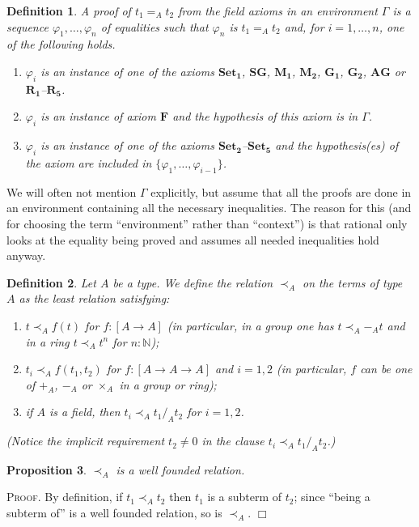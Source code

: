 \documentclass{article}
\newtheorem{definition}{Definition}[section]
\newtheorem{proposition}[definition]{Proposition}
\newenvironment{proof}{\smallskip\textsc{Proof.}}{\hspace*{\fill}$\Box$}
\newcommand{\tacticname}[1]{\textsf{#1}}
\newcommand{\rational}{\tacticname{rational}}
\newcommand{\less}{\mathrel{\prec_A}}
\newcommand{\nat}{{\mathbb N}}
\newcommand{\axiom}[1]{\ensuremath{\mathbf{#1}}}
\begin{document}
\begin{definition}\label{defn:proof} A \emph{proof} of $t_1=_A t_2$ from
the field axioms in an environment $\Gamma$ is a sequence
$\varphi_1,\ldots,\varphi_n$ of equalities such that $\varphi_n$ is
$t_1=_A t_2$ and, for $i=1,\ldots,n$, one of the following holds.
\begin{enumerate}[--]
\item $\varphi_i$ is an instance of one of the axioms \axiom{Set_1},
\axiom{SG}, \axiom{M_1}, \axiom{M_2}, \axiom{G_1}, \axiom{G_2},
\axiom{AG} or \axiom{R_1}--\axiom{R_5}.
\item $\varphi_i$ is an instance of axiom \axiom{F} and the hypothesis
of this axiom is in $\Gamma$.
\item $\varphi_i$ is an instance of one of the axioms
\axiom{Set_2}--\axiom{Set_5} and the hypothesis(es) of the axiom are
included in $\{\varphi_1,\ldots,\varphi_{i-1}\}$.
\end{enumerate}
\end{definition}

We will often not mention $\Gamma$ explicitly, but assume that all the
proofs are done in an environment containing all the necessary inequalities.
The reason for this (and for choosing the term ``environment'' rather than
``context'') is that {\rational} only looks at the equality being proved
and assumes all needed inequalities hold anyway.

\begin{definition}\label{defn:less} Let $A$ be a type.  We define the relation
$\less$ on the terms of type $A$ as the least relation satisfying:
\begin{enumerate}
\item $t\less f(t)$ for $f:[A\to A]$ (in particular, in a group one has
$t\less -_A t$ and in a ring $t\less t^n$ for $n:\nat$);
\item $t_i\less f(t_1,t_2)$ for $f:[A\to A\to A]$ and $i=1,2$ (in
particular, $f$ can be one of $+_A$, $-_A$ or $\times_A$ in a group or
ring);
\item if $A$ is a field, then $t_i\less t_1/_A t_2$ for $i=1,2$.
\end{enumerate}
(Notice the implicit requirement $t_2\neq 0$ in the clause
$t_i\less t_1/_A t_2$.)
\end{definition}

\begin{proposition}\label{lesswff}
$\less$ is a well founded relation.
\end{proposition}
\begin{proof}
By definition, if $t_1\less t_2$ then $t_1$ is a subterm of $t_2$; since
``being a subterm of'' is a well founded relation, so is $\less$.
\end{proof}
\end{document}
